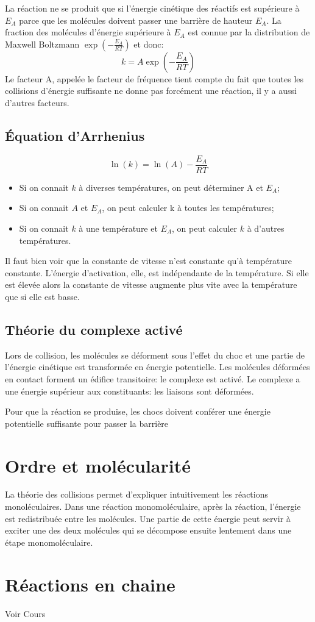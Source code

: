 La réaction ne se produit que si l'énergie cinétique des réactifs est
supérieure à $E_A$ parce que les molécules
doivent passer une barrière de hauteur $E_A$.
La fraction des molécules d'énergie supérieure à
$E_A$ est connue par la distribution de Maxwell Boltzmann
$\exp \left(-\frac{E_A}{RT}\right)$ et donc:
\[ k = A \exp \left(-\frac{E_A}{RT}\right) \]
Le facteur A, appelée le facteur de fréquence tient compte du fait
que toutes les collisions d'énergie suffisante ne donne pas
forcément une réaction, il y a aussi d'autres facteurs.

\subsection{Équation d'Arrhenius}
\[ \ln(k) = \ln(A)-\frac{E_A}{RT} \]
\begin{itemize}
  \item Si on connait $k$ à diverses températures,
    on peut déterminer A et $E_A$;
  \item Si on connait $A$ et $E_A$,
    on peut calculer k à toutes les températures;
  \item Si on connait $k$ à une température et $E_A$,
    on peut calculer $k$ à d'autres températures.
\end{itemize}
Il faut bien voir que la constante de vitesse
n'est constante qu'à température constante.
L'énergie d'activation, elle, est indépendante de la température.
Si elle est élevée alors la constante de vitesse augmente
plus vite avec la température que si elle est basse.

\subsection{Théorie du complexe activé}
Lors de collision, les molécules se déforment sous l'effet du choc et
une partie de l'énergie cinétique est transformée en énergie potentielle.
Les molécules déformées en contact forment un édifice transitoire:
le complexe est activé.
Le complexe a une énergie supérieur aux constituants:
les liaisons sont déformées.

Pour que la réaction se produise,
les chocs doivent conférer une énergie potentielle
suffisante pour passer la barrière

\section{Ordre et molécularité}
La théorie des collisions permet d'expliquer
intuitivement les réactions monoléculaires.
Dans une réaction monomoléculaire, après la réaction,
l'énergie est redistribuée entre les molécules.
Une partie de cette énergie peut servir à exciter une des deux molécules qui
se décompose ensuite lentement dans une étape monomoléculaire.

\section{Réactions en chaine}
Voir Cours


